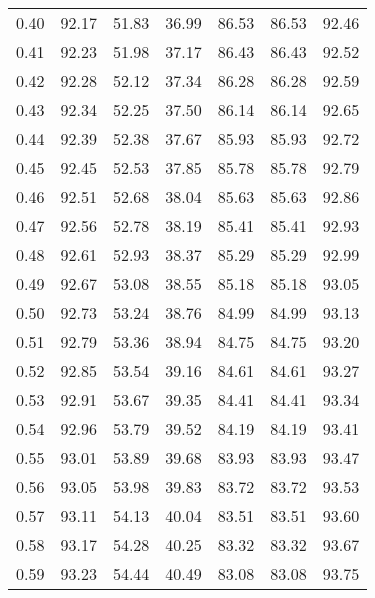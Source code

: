 \begin{tabular}{|c|c|c|c|c|c|c|}
      0.40 &     92.17 &     51.83 &      36.99 &   86.53 &      86.53 &         92.46 \\
      0.41 &     92.23 &     51.98 &      37.17 &   86.43 &      86.43 &         92.52 \\
      0.42 &     92.28 &     52.12 &      37.34 &   86.28 &      86.28 &         92.59 \\
      0.43 &     92.34 &     52.25 &      37.50 &   86.14 &      86.14 &         92.65 \\
      0.44 &     92.39 &     52.38 &      37.67 &   85.93 &      85.93 &         92.72 \\
      0.45 &     92.45 &     52.53 &      37.85 &   85.78 &      85.78 &         92.79 \\
      0.46 &     92.51 &     52.68 &      38.04 &   85.63 &      85.63 &         92.86 \\
      0.47 &     92.56 &     52.78 &      38.19 &   85.41 &      85.41 &         92.93 \\
      0.48 &     92.61 &     52.93 &      38.37 &   85.29 &      85.29 &         92.99 \\
      0.49 &     92.67 &     53.08 &      38.55 &   85.18 &      85.18 &         93.05 \\
      0.50 &     92.73 &     53.24 &      38.76 &   84.99 &      84.99 &         93.13 \\
      0.51 &     92.79 &     53.36 &      38.94 &   84.75 &      84.75 &         93.20 \\
      0.52 &     92.85 &     53.54 &      39.16 &   84.61 &      84.61 &         93.27 \\
      0.53 &     92.91 &     53.67 &      39.35 &   84.41 &      84.41 &         93.34 \\
      0.54 &     92.96 &     53.79 &      39.52 &   84.19 &      84.19 &         93.41 \\
      0.55 &     93.01 &     53.89 &      39.68 &   83.93 &      83.93 &         93.47 \\
      0.56 &     93.05 &     53.98 &      39.83 &   83.72 &      83.72 &         93.53 \\
      0.57 &     93.11 &     54.13 &      40.04 &   83.51 &      83.51 &         93.60 \\
      0.58 &     93.17 &     54.28 &      40.25 &   83.32 &      83.32 &         93.67 \\
      0.59 &     93.23 &     54.44 &      40.49 &   83.08 &      83.08 &         93.75 \\

\end{tabular}
